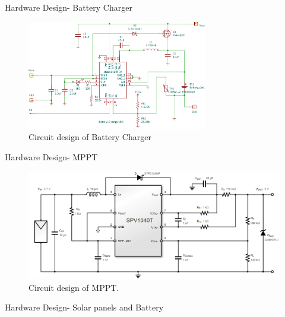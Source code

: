 \documentclass[aspectratio=169]{beamer}
\begin{document}
		\begin{frame}{Hardware Design- Battery Charger }
	\begin{figure}[h]
		\centering
		\includegraphics[width=0.7\textwidth]{diag/charg.pdf}
		\caption{Circuit design of Battery Charger}
		\label{fig:mesh1}
	\end{figure}
\end{frame}





	
	\begin{frame}{Hardware Design- MPPT }
		\begin{figure}[h]
			\centering
			\includegraphics[width=1\textwidth]{diag/MPPT.png}
			\caption{Circuit design of MPPT.}
			\label{fig:mesh1}
		\end{figure}
	\end{frame}

	\begin{frame}{Hardware Design- Solar panels and Battery }
		
	\end{frame}
	
\end{document}
